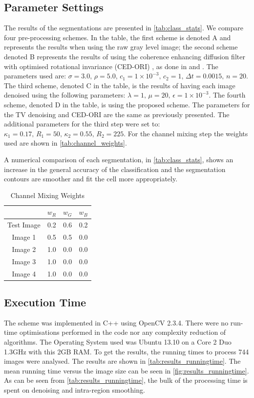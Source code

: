\documentclass[a4paper,11pt]{ijamas}
\begin{document}
\subsection{Parameter Settings}
The results of the segmentations are presented in \autoref{tab:class_stats}. We compare four pre-processing schemes. In the table, the first scheme is denoted A and represents the results when using the raw gray level image; the  second scheme denoted B represents the results of using the coherence enhancing diffusion filter with optimised rotational invariance (CED-ORI) \cite{jweickert:2002}, as done in \cite{mmaska:2013} and \cite{dkroon:2009}. The parameters used are:
$\sigma = 3.0, \, \rho = 5.0, \, c_1 = 1 \times 10^{-3}, \, c_2 = 1, \, \Delta t = 0.0015, \, n=20$.
The third scheme, denoted  C in the table, is the results of having each image denoised using the following parameters: $\lambda = 1, \, \mu = 20,  \, \epsilon = 1 \times 10^{-3}$.
The fourth scheme, denoted D in the table, is using the proposed scheme. The parameters for the TV denoising and CED-ORI are the same as previously presented. The additional parameters for the third step were set to: $\kappa_1 = 0.17, \, R_1 = 50, \, \kappa_2 = 0.55, \, R_2 = 225$. For the channel mixing step the weights used are shown in \autoref{tab:channel_weights}.

A numerical comparison of each segmentation, in \autoref{tab:class_stats}, shows an increase in the general accuracy of the classification and the segmentation contours are smoother and fit the cell more appropriately.

\begin{table}
\renewcommand{\arraystretch}{1.3}
\caption{Channel Mixing Weights}
\label{tab:channel_weights}
\centering
\begin{tabular}{cccc}
   \hline
           	& $w_R$	& $w_G$	& $w_B$\\ \hline
Test Image  	& 0.2 	& 0.6 	& 0.2 \\ \hline
Image 1     	& 0.5 	& 0.5 	& 0.0 \\ \hline
Image 2		& 1.0 	& 0.0 	& 0.0 \\ \hline
Image 3		& 1.0 	& 0.0 	& 0.0 \\ \hline
Image 4		& 1.0 	& 0.0 	& 0.0 \\ \hline
\end{tabular}
\end{table}

\subsection{Execution Time}
The scheme was implemented in C++ using OpenCV 2.3.4. There were no run-time optimisations performed in the code nor any complexity reduction of algorithms. The Operating System used was Ubuntu 13.10 on a Core 2 Duo 1.3GHz with this 2GB RAM. To get the results, the running times to process 744 images  were analysed. The results are shown in \autoref{tab:results_runningtime}. The mean running time versus the image size can be seen in \autoref{fig:results_runningtime}. As can be seen from \autoref{tab:results_runningtime}, the bulk of the processing time is spent on denoising and intra-region smoothing.
\end{document}
